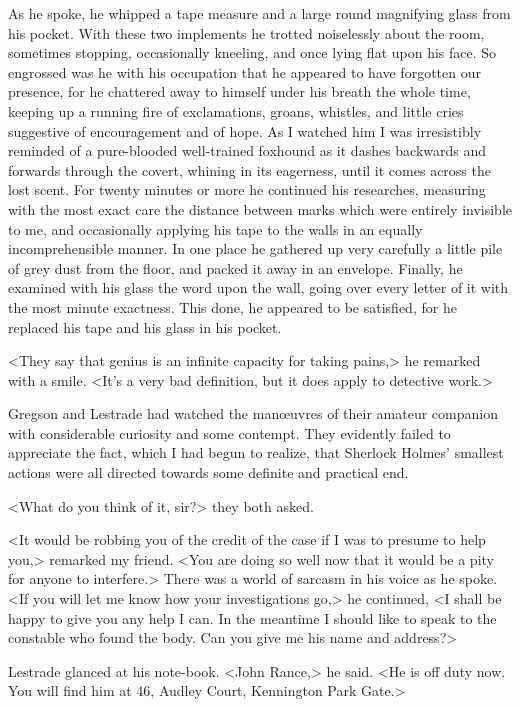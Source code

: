 As he spoke, he whipped a tape measure and a large round magnifying glass from his pocket. With these two implements he trotted noiselessly about the room, sometimes stopping, occasionally kneeling, and once lying flat upon his face. So engrossed was he with his occupation that he appeared to have forgotten our presence, for he chattered away to himself under his breath the whole time, keeping up a running fire of exclamations, groans, whistles, and little cries suggestive of encouragement and of hope. As I watched him I was irresistibly reminded of a pure-blooded well-trained foxhound as it dashes backwards and forwards through the covert, whining in its eagerness, until it comes across the lost scent. For twenty minutes or more he continued his researches, measuring with the most exact care the distance between marks which were entirely invisible to me, and occasionally applying his tape to the walls in an equally incomprehensible manner. In one place he gathered up very carefully a little pile of grey dust from the floor, and packed it away in an envelope. Finally, he examined with his glass the word upon the wall, going over every letter of it with the most minute exactness. This done, he appeared to be satisfied, for he replaced his tape and his glass in his pocket.

<They say that genius is an infinite capacity for taking pains,> he remarked with a smile. <It's a very bad definition, but it does apply to detective work.>

Gregson and Lestrade had watched the manœuvres of their amateur companion with considerable curiosity and some contempt. They evidently failed to appreciate the fact, which I had begun to realize, that Sherlock Holmes' smallest actions were all directed towards some definite and practical end.

<What do you think of it, sir?> they both asked.

<It would be robbing you of the credit of the case if I was to presume to help you,> remarked my friend. <You are doing so well now that it would be a pity for anyone to interfere.> There was a world of sarcasm in his voice as he spoke. <If you will let me know how your investigations go,> he continued, <I shall be happy to give you any help I can. In the meantime I should like to speak to the constable who found the body. Can you give me his name and address?>

Lestrade glanced at his note-book. <John Rance,> he said. <He is off duty now. You will find him at 46, Audley Court, Kennington Park Gate.>

